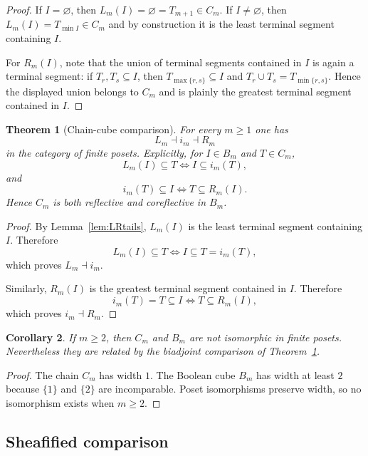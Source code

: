 \documentclass[11pt,a4paper]{article}
\newtheorem{theorem}{Theorem}[section]
\newtheorem{corollary}[theorem]{Corollary}
\theoremstyle{definition}
\theoremstyle{remark}
\begin{document}
\begin{proof}
If $I=\varnothing$, then $L_m(I)=\varnothing=T_{m+1}\in C_m$.  If $I\neq\varnothing$, then $L_m(I)=T_{\min I}\in C_m$ and by construction it is the least terminal segment containing $I$.

For $R_m(I)$, note that the union of terminal segments contained in $I$ is again a terminal segment: if $T_r,T_s\subseteq I$, then $T_{\max\{r,s\}}\subseteq I$ and $T_r\cup T_s=T_{\min\{r,s\}}$.  Hence the displayed union belongs to $C_m$ and is plainly the greatest terminal segment contained in $I$.
\end{proof}

\begin{theorem}[Chain-cube comparison]\label{thm:chain-cube}
For every $m\ge1$ one has
\[
L_m\dashv i_m\dashv R_m
\]
in the category of finite posets.  Explicitly, for $I\in B_m$ and $T\in C_m$,
\[
L_m(I)\subseteq T \iff I\subseteq i_m(T),
\]
and
\[
i_m(T)\subseteq I \iff T\subseteq R_m(I).
\]
Hence $C_m$ is both reflective and coreflective in $B_m$.
\end{theorem}

\begin{proof}
By Lemma~\ref{lem:LRtails}, $L_m(I)$ is the least terminal segment containing $I$.  Therefore
\[
L_m(I)\subseteq T\iff I\subseteq T=i_m(T),
\]
which proves $L_m\dashv i_m$.

Similarly, $R_m(I)$ is the greatest terminal segment contained in $I$.  Therefore
\[
i_m(T)=T\subseteq I\iff T\subseteq R_m(I),
\]
which proves $i_m\dashv R_m$.
\end{proof}

\begin{corollary}\label{cor:not-iso-chain-cube}
If $m\ge2$, then $C_m$ and $B_m$ are not isomorphic in finite posets.  Nevertheless they are related by the biadjoint comparison of Theorem~\ref{thm:chain-cube}.
\end{corollary}

\begin{proof}
The chain $C_m$ has width $1$.  The Boolean cube $B_m$ has width at least $2$ because $\{1\}$ and $\{2\}$ are incomparable.  Poset isomorphisms preserve width, so no isomorphism exists when $m\ge2$.
\end{proof}

\subsection{Sheafified comparison}
\end{document}
